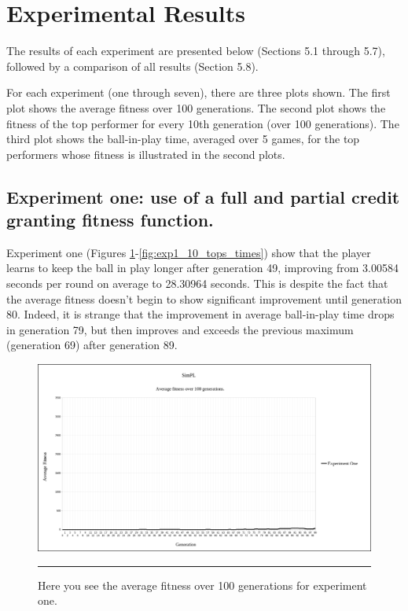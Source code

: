\section{Experimental Results}

The results of each experiment are presented below (Sections 5.1 through 5.7), followed by a comparison of all results (Section 5.8).

For each experiment (one through seven), there are three plots shown. The first plot shows the average fitness over 100 generations. The second plot shows the fitness of the top performer for every 10th generation (over 100 generations). The third plot shows the ball-in-play time, averaged over 5 games, for the top performers whose fitness is illustrated in the second plots.

\subsection[Experiment One]{Experiment one: use of a full and partial credit granting fitness function.}

Experiment one (Figures \ref{fig:exp1_avg_fit}-\ref{fig:exp1_10_tops_times}) show that the player learns to keep the ball in play longer after generation 49, improving from 3.00584 seconds per round on average to 28.30964 seconds. This is despite the fact that the average fitness doesn't begin to show significant improvement until generation 80. Indeed, it is strange that the improvement in average ball-in-play time drops in generation 79, but then improves and exceeds the previous maximum (generation 69) after generation 89.

\begin{figure}[htbp]  
  \centering
  \includegraphics[width=5in]{../Figures/Chapter3/exp1_avg_fit.png}
  \rule{35em}{0.5pt}
  \caption[Experiment One Average Fitness]{Here you see the average fitness over 100 generations for experiment one.}
  \label{fig:exp1_avg_fit}
\end{figure}

